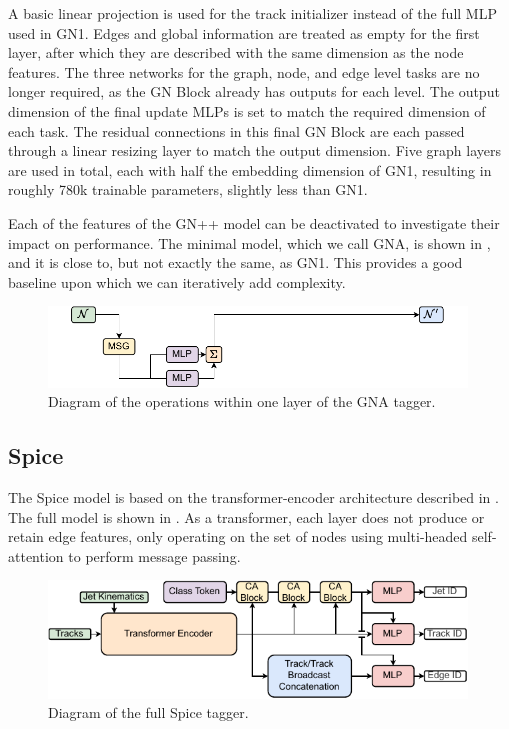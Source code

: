 A basic linear projection is used for the track initializer instead of the full MLP used in GN1.
Edges and global information are treated as empty for the first layer, after which they are described with the same dimension as the node features.
The three networks for the graph, node, and edge level tasks are no longer required, as the GN Block already has outputs for each level.
The output dimension of the final update MLPs is set to match the required dimension of each task.
The residual connections in this final GN Block are each passed through a linear resizing layer to match the output dimension.
Five graph layers are used in total, each with half the embedding dimension of GN1, resulting in roughly 780k trainable parameters, slightly less than GN1.

Each of the features of the GN++ model can be deactivated to investigate their impact on performance.
The minimal model, which we call GNA, is shown in , and it is close to, but not exactly the same, as GN1.
This provides a good baseline upon which we can iteratively add complexity.

\begin{figure}[h!]
    \centering
    \includegraphics[width=0.99\textwidth]{figures/flavour_tagging/gna.pdf}
    \caption{Diagram of the operations within one layer of the GNA tagger.}
    \label{fig:gna_graph}
\end{figure}

\subsection{Spice}

The Spice model is based on the transformer-encoder architecture described in .
The full model is shown in .
As a transformer, each layer does not produce or retain edge features, only operating on the set of nodes using multi-headed self-attention to perform message passing.

\begin{figure}[h!]
    \centering
    \includegraphics[width=0.99\textwidth]{figures/flavour_tagging/spice_full.pdf}
    \caption{Diagram of the full Spice tagger.}
    \label{fig:spicefull}
\end{figure}

